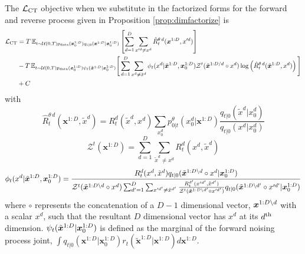 \documentclass{article}
\begin{document}
\begin{proposition} \label{prop:FactorizedELBO}
The $\mathcal{L}_{\textup{CT}}$ objective when we substitute in the factorized forms for the forward and reverse process given in Proposition \ref{prop:dimfactorize} is
\begin{align}
    \mathcal{L}_{\textup{CT}} &= T \, \mathbb{E}_{t\sim \mathcal{U}(0,T) p_{\textup{data}}(\bm{x}_0^{1:D}) q_{t|0}(\bm{x}^{1:D} | \bm{x}_0^{1:D})} \left[\sum_{d=1}^D \sum_{x'^d \neq x^d} \hat{R}_t^{\theta \, d}(\bm{x}^{1:D}, x'^d) \right]\\
    & - T \, \mathbb{E}_{t\sim \mathcal{U}(0, T) p_{\textup{data}}(\bm{x}_0^{1:D}) \psi_t(\tilde{\bm{x}}^{1:D} | \bm{x}_0^{1:D})} \Bigg[ \sum_{d=1}^D \sum_{x^d \neq \tilde{x}^d} \phi_t(x^d | \tilde{\bm{x}}^{1:D}, \bm{x}_0^{1:D}) \mathcal{Z}^t(\tilde{\bm{x}}^{1:D/d} \circ x^d) \log \left( \hat{R}_t^{\theta \, d}(\tilde{\bm{x}}^{1:D}, x^d) \right) \Bigg]\\
    & + C
\end{align}
with
\begin{equation}
    \hat{R}_t^{\theta \, d} (\bm{x}^{1:D}, \tilde{x}^d) = R_t^d(\tilde{x}^d, x^d) \sum_{x_0^d} p_{0|t}^\theta (x_0^d | \bm{x}^{1:D}) \frac{q_{t|0}(\tilde{x}^d | x_0^d)}{q_{t|0}(x^d | x_0^d)}
\end{equation}
\begin{equation}
    \mathcal{Z}^t(\bm{x}^{1:D}) = \sum_{d=1}^D \sum_{\tilde{x}^d \neq x^d} R_t^d(x^d, \tilde{x}^d)
\end{equation}
\begin{equation}
    \phi_t(x^d | \tilde{\bm{x}}^{1:D}, \bm{x}_0^{1:D}) = \frac{R_t^d(x^d, \tilde{x}^d)  q_{t|0}(\tilde{\bm{x}}^{1:D \backslash d} \circ x^d | \bm{x}_0^{1:D})}{\mathcal{Z}^t(\tilde{\bm{x}}^{1:D \backslash d} \circ x^d  )   \sum_{d'=1}^D \sum_{x'^{d'} \neq \tilde{x}^{d'}} \frac{R_t^{d'}(x'^{d'}, \tilde{x}^{d'})}{\mathcal{Z}^t(\tilde{\bm{x}}^{1:D \backslash {d'}} \circ x'^{d'}  )} q_{t|0}(\tilde{\bm{x}}^{1:D \backslash d'} \circ x'^{d'} | \bm{x}_0^{1:D})}
\end{equation}
where $\circ$ represents the concatenation of a $D-1$ dimensional vector, $\bm{x}^{1:D \backslash d}$ with a scalar $x^d$, such that the resultant $D$ dimensional vector has $x^d$ at its $d^{\textup{th}}$ dimension.
$\psi_t(\tilde{\bm{x}}^{1:D} | \bm{x}_0^{1:D})$ is defined as the marginal of the forward noising process joint, $\int q_{t|0}(\bm{x}^{1:D} | \bm{x}_0^{1:D}) r_t(\tilde{\bm{x}}^{1:D} | \bm{x}^{1:D}) d \bm{x}^{1:D}$.
\end{proposition}
\end{document}
